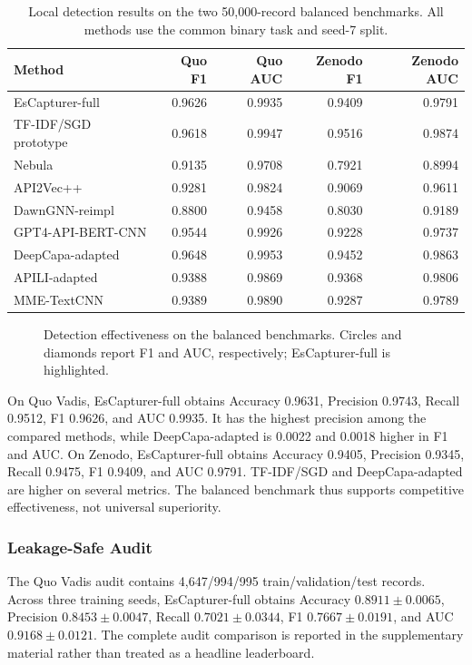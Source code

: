 \begin{table}[!t]
\caption{Local detection results on the two 50,000-record balanced
benchmarks.  All methods use the common binary task and seed-7 split.}
\label{tab:rq1-balanced-main}
\centering
\scriptsize
\setlength{\tabcolsep}{5pt}
\begin{tabular}{lrrrr}
\hline
Method & Quo F1 & Quo AUC & Zenodo F1 & Zenodo AUC \\
\hline
EsCapturer-full & 0.9626 & 0.9935 & 0.9409 & 0.9791 \\
TF-IDF/SGD prototype & 0.9618 & 0.9947 & 0.9516 & 0.9874 \\
Nebula & 0.9135 & 0.9708 & 0.7921 & 0.8994 \\
API2Vec++ & 0.9281 & 0.9824 & 0.9069 & 0.9611 \\
DawnGNN-reimpl & 0.8800 & 0.9458 & 0.8030 & 0.9189 \\
GPT4-API-BERT-CNN & 0.9544 & 0.9926 & 0.9228 & 0.9737 \\
DeepCapa-adapted & 0.9648 & 0.9953 & 0.9452 & 0.9863 \\
APILI-adapted & 0.9388 & 0.9869 & 0.9368 & 0.9806 \\
MME-TextCNN & 0.9389 & 0.9890 & 0.9287 & 0.9789 \\
\hline
\end{tabular}
\end{table}

\begin{figure}[!t]
\centering
{}
\caption{Detection effectiveness on the balanced benchmarks.  Circles and
diamonds report F1 and AUC, respectively; EsCapturer-full is highlighted.}
\label{fig:rq1-balanced-paired}
\end{figure}

On Quo Vadis, EsCapturer-full obtains Accuracy 0.9631, Precision 0.9743,
Recall 0.9512, F1 0.9626, and AUC 0.9935.  It has the highest precision among
the compared methods, while DeepCapa-adapted is 0.0022 and 0.0018 higher in
F1 and AUC.  On Zenodo, EsCapturer-full obtains Accuracy 0.9405, Precision
0.9345, Recall 0.9475, F1 0.9409, and AUC 0.9791.  TF-IDF/SGD and
DeepCapa-adapted are higher on several metrics.  The balanced benchmark thus
supports competitive effectiveness, not universal superiority.

\subsubsection{Leakage-Safe Audit}
The Quo Vadis audit contains 4,647/994/995 train/validation/test records.
Across three training seeds, EsCapturer-full obtains Accuracy
$0.8911{\pm}0.0065$, Precision $0.8453{\pm}0.0047$, Recall
$0.7021{\pm}0.0344$, F1 $0.7667{\pm}0.0191$, and AUC
$0.9168{\pm}0.0121$.  The complete audit comparison is reported in the
supplementary material rather than treated as a headline leaderboard.


